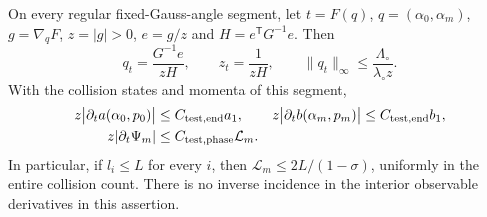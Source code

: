 \begin{lemma}
\label{lem:wo-derivatives}
On every regular fixed-Gauss-angle segment, let $t=F(q)$,
$q=(\alpha_0,\alpha_m)$, $g=\nabla_qF$, $z=|g|>0$,
$e=g/z$ and $H=e^{\mathsf T}G^{-1}e$.  Then
\begin{equation}\label{eq:wo-gauss}
 q_t=\frac{G^{-1}e}{zH},\qquad
 z_t=\frac1{zH},\qquad
 \|q_t\|_\infty\le\frac{\Lambda_\circ}{\lambda_\circ z}.
\end{equation}
With the collision states and momenta of this segment,
\begin{align}
 z\bigl|\partial_t a(\alpha_0,p_0)\bigr|
       &\le C_{\rm test,end}a_1,
 &z\bigl|\partial_t b(\alpha_m,p_m)\bigr|
       &\le C_{\rm test,end}b_1,                        \label{eq:wo-endpoint-derivative}\\
 z|\partial_t\Psi_m|&\le C_{\rm test,phase}\mathcal L_m.
                                                        \label{eq:wo-phase-derivative}
\end{align}
In particular, if $l_i\le L$ for every $i$, then
$\mathcal L_m\le2L/(1-\sigma)$, uniformly in the entire collision
count.  There is no inverse incidence in the interior observable
derivatives in this assertion.
\end{lemma}
